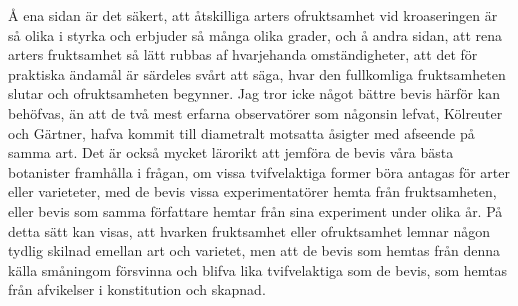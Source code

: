 Å ena sidan är det säkert, att åtskilliga arters ofruktsamhet vid kroaseringen är så olika i styrka och erbjuder så många olika grader, och å andra sidan, att rena arters fruktsamhet så lätt rubbas af hvarjehanda omständigheter, att det för praktiska ändamål är särdeles svårt att säga, hvar den fullkomliga fruktsamheten slutar och ofruktsamheten begynner. Jag tror icke något bättre bevis härför kan behöfvas, än att de två mest erfarna observatörer som någonsin lefvat, Kölreuter och Gärtner, hafva kommit till diametralt motsatta åsigter med afseende på samma art. Det är också mycket lärorikt att jemföra de bevis våra bästa botanister framhålla i frågan, om vissa tvifvelaktiga former böra antagas för arter eller varieteter, med de bevis vissa experimentatörer hemta från fruktsamheten, eller bevis som samma författare hemtar från sina experiment under olika år. På detta sätt kan visas, att hvarken fruktsamhet eller ofruktsamhet lemnar någon tydlig skilnad emellan art och varietet, men att de bevis som hemtas från denna källa småningom försvinna och blifva lika tvifvelaktiga som de bevis, som hemtas från afvikelser i konstitution och skapnad.

